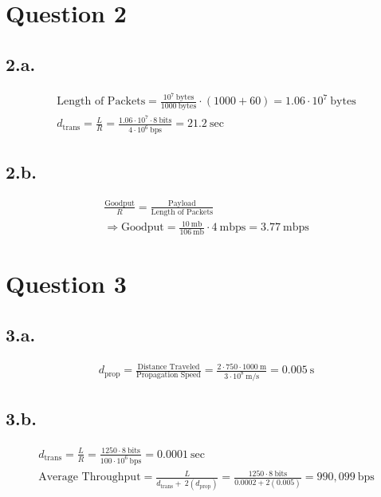 \documentclass[12pt]{article}
\begin{document}
\section{Question 2}

\subsection{2.a.}

\begin{gather}
    \text{Length of Packets} = \frac{10^7 \ \text{bytes}}{1000 \
    \text{bytes}} \cdot (1000 + 60) = 1.06 \cdot 10^7 \ \text{bytes}\\
    d_{\text{trans}} = \frac{L}{R} = \frac{1.06 \cdot 10^7 \cdot 8\ \text{bits}}{4 \cdot 10^6 \ \text{bps}} = 21.2 \ \text{sec}
\end{gather}

\subsection{2.b.}

\begin{gather}
    \frac{\text{Goodput}}{R} = \frac{\text{Payload}}{\text{Length of Packets}} \\
    \Longrightarrow \text{Goodput} = \frac{10 \ \text{mb}}{106 \ \text{mb}} \cdot 4 \ \text{mbps} = 3.77 \ \text{mbps}
\end{gather}


\section{Question 3}

\subsection{3.a.}

\begin{gather}
    d_{\text{prop}} = \frac{\text{Distance Traveled}}{\text{Propagation Speed}} = \frac{2 \cdot 750 \cdot 1000 \ \text{m}}{3 \cdot 10^{8} \ \text{m/s}} = 0.005 \ \text{s}
\end{gather}

\subsection{3.b.}

\begin{gather}
    d_{\text{trans}} = \frac{L}{R} = \frac{1250 \cdot 8\ \text{bits}}{100 \cdot 10^6 \ \text{bps}} = 0.0001 \ \text{sec}\\
    \text{Average Throughput} = \frac{L}{d_{\text{trans}} + \ 2(d_{\text{prop}})} = \frac{1250 \cdot 8\ \text{bits}}{0.0002 + 2(0.005)} = 990,099 \ \text{bps}
\end{gather}
\end{document}
